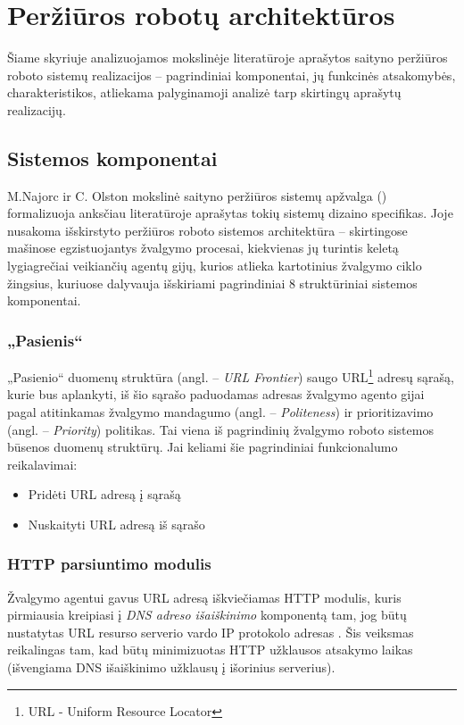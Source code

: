 \section{Peržiūros robotų architektūros}

Šiame skyriuje analizuojamos mokslinėje literatūroje aprašytos saityno peržiūros roboto sistemų realizacijos -- pagrindiniai komponentai, jų funkcinės atsakomybės, charakteristikos, atliekama palyginamoji analizė tarp skirtingų aprašytų realizacijų.

\subsection{Sistemos komponentai}

M.Najorc ir C. Olston mokslinė saityno peržiūros sistemų apžvalga (\cite{StanfWebCrawl}) formalizuoja anksčiau literatūroje aprašytas tokių sistemų dizaino specifikas. Joje nusakoma išskirstyto peržiūros roboto sistemos architektūra -- skirtingose mašinose egzistuojantys žvalgymo procesai, kiekvienas jų turintis keletą lygiagrečiai veikiančių agentų gijų, kurios atlieka kartotinius žvalgymo ciklo žingsius, kuriuose dalyvauja išskiriami pagrindiniai 8 struktūriniai sistemos komponentai.

\subsubsection{„Pasienis“}

„Pasienio“ duomenų struktūra (angl. -- \textit{URL Frontier}) saugo URL\footnote{URL - Uniform Resource Locator} adresų sąrašą, kurie bus aplankyti, iš šio sąrašo paduodamas adresas žvalgymo agento gijai pagal atitinkamas žvalgymo mandagumo (angl. -- \textit{Politeness}) ir prioritizavimo (angl. -- \textit{Priority}) politikas. Tai viena iš pagrindinių žvalgymo roboto sistemos būsenos duomenų struktūrų. Jai keliami šie pagrindiniai funkcionalumo reikalavimai:
\begin{itemize}
    \item Pridėti URL adresą į sąrašą
    \item Nuskaityti URL adresą iš sąrašo
\end{itemize}

\subsubsection{HTTP parsiuntimo modulis}

Žvalgymo agentui gavus URL adresą iškviečiamas HTTP modulis, kuris pirmiausia kreipiasi į \textit{DNS adreso išaiškinimo} komponentą tam, jog būtų nustatytas URL resurso serverio vardo IP protokolo adresas \cite{StanfWebCrawl}. Šis veiksmas reikalingas tam, kad būtų minimizuotas HTTP užklausos atsakymo laikas (išvengiama DNS išaiškinimo užklausų į išorinius serverius).

